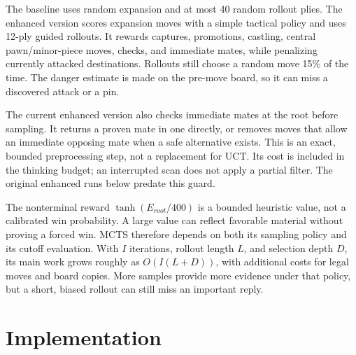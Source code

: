 \documentclass[oneside,final]{hcmut-report}
\begin{document}
The baseline uses random expansion and at most 40 random rollout plies.
The enhanced version scores expansion moves with a simple tactical policy
and uses 12-ply guided rollouts. It rewards captures, promotions, castling,
central pawn/minor-piece moves, checks, and immediate mates, while penalizing
currently attacked destinations. Rollouts still choose a random move 15\%
of the time. The danger estimate is made on the pre-move board, so it can
miss a discovered attack or a pin.

The current enhanced version also checks immediate mates at the root before
sampling. It returns a proven mate in one directly, or removes moves that
allow an immediate opposing mate when a safe alternative exists. This is
an exact, bounded preprocessing step, not a replacement for UCT. Its cost
is included in the thinking budget; an interrupted scan does not apply a
partial filter. The original enhanced runs below predate this guard.

The nonterminal reward $\tanh(E_{root}/400)$ is a bounded heuristic value,
not a calibrated win probability. A large value can reflect favorable
material without proving a forced win. MCTS therefore depends on both its
sampling policy and its cutoff evaluation. With $I$ iterations, rollout
length $L$, and selection depth $D$, its main work grows roughly as
$O(I(L+D))$, with additional costs for legal moves and board copies. More
samples provide more evidence under that policy, but a short, biased rollout
can still miss an important reply.

\section{Implementation}
\end{document}
